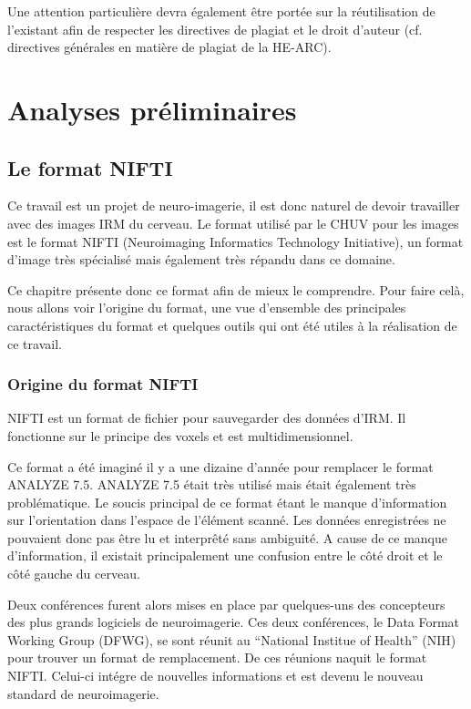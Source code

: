 \documentclass[a4paper,10pt,openany,oneside]{sphinxmanual}
\begin{document}
Une attention particulière devra également être portée sur la réutilisation de l’existant afin de respecter les directives de plagiat et le droit
d’auteur (cf. directives générales en matière de plagiat de la HE-ARC).


\chapter{Analyses préliminaires}
\label{index:analyses-preliminaires}

\section{Le format NIFTI}
\label{index:le-format-nifti}
Ce travail est un projet de neuro-imagerie, il est donc naturel de devoir travailler avec des
images IRM du cerveau. Le format utilisé par le CHUV pour les images est le format NIFTI
(Neuroimaging Informatics Technology Initiative), un format d'image très spécialisé mais
également très répandu dans ce domaine.

Ce chapitre présente donc ce format afin de mieux le comprendre. Pour faire celà, nous
allons voir l'origine du format, une vue d'ensemble des principales caractéristiques du format
et quelques outils qui ont été utiles à la réalisation de ce travail.


\subsection{Origine du format NIFTI}
\label{index:origine-du-format-nifti}
NIFTI est un format de fichier pour sauvegarder des données d'IRM. Il fonctionne
sur le principe des voxels et est multidimensionnel.

Ce format a été imaginé il y a une dizaine d'année pour remplacer le format ANALYZE 7.5.
ANALYZE 7.5 était très utilisé mais était également très problématique. Le soucis principal de
ce format étant le manque d'information sur l'orientation dans l'espace de l'élément scanné.
Les données enregistrées ne pouvaient donc pas être lu et interprêté sans ambiguité. A cause
de ce manque d'information, il existait principalement une confusion entre le côté droit et le
côté gauche du cerveau.

Deux conférences furent alors mises en place par quelques-uns des concepteurs des plus grands
logiciels de neuroimagerie. Ces deux conférences, le Data Format Working Group (DFWG), se sont
réunit au ``National Institue of Health'' (NIH) pour trouver un format de remplacement. De ces
réunions naquit le format NIFTI. Celui-ci intégre de nouvelles informations et est devenu
le nouveau standard de neuroimagerie.
\end{document}
